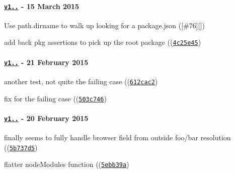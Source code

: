 \paragraph*{\href{https://github.com/browserify/resolve/compare/v1.1.5...v1.1.6}{\tt v1..} -\/ 15 March 2015}


\begin{DoxyItemize}
\item Use path.\+dirname to walk up looking for a package.\+json (\mbox{[}{\ttfamily \#76}\mbox{]}\mbox{[}\mbox{]})
\item add back pkg assertions to pick up the root package ((\href{https://github.com/browserify/resolve/commit/4c25e45625fea7980463fc107fc843aab7e0d993}{\tt {\ttfamily 4c25e45}})
\end{DoxyItemize}

\paragraph*{\href{https://github.com/browserify/resolve/compare/v1.1.4...v1.1.5}{\tt v1..} -\/ 21 February 2015}


\begin{DoxyItemize}
\item another test, not quite the failing case ((\href{https://github.com/browserify/resolve/commit/612cac2beac41fb13b7b12a9dfdb4207391260c1}{\tt {\ttfamily 612cac2}})
\item fix for the failing case ((\href{https://github.com/browserify/resolve/commit/503c746a6e64d50f2c9b18b4476ffcfed49947f2}{\tt {\ttfamily 503c746}})
\end{DoxyItemize}

\paragraph*{\href{https://github.com/browserify/resolve/compare/v1.1.3...v1.1.4}{\tt v1..} -\/ 20 February 2015}


\begin{DoxyItemize}
\item finally seems to fully handle browser field from outside foo/bar resolution ((\href{https://github.com/browserify/resolve/commit/5b737d58b38ce891ef3f06d600d0562dbbc8539c}{\tt {\ttfamily 5b737d5}})
\item flatter node\+Modules function ((\href{https://github.com/browserify/resolve/commit/5ebb39a19b62c052ff6201600c3d2fffb3f5fdcb}{\tt {\ttfamily 5ebb39a}})
\end{DoxyItemize}


